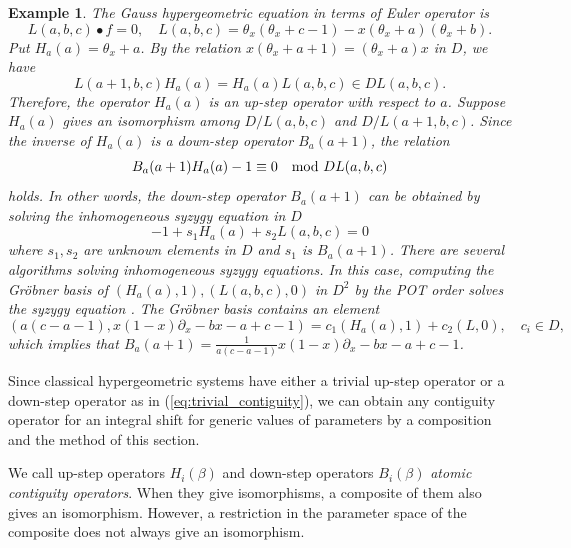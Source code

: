 \documentclass{article}
\def\aa{a}
\def\bb{b}
\def\cc{c}
\def\pd#1{\partial_{#1}}
\newtheorem{example}{Example}
\begin{document}
\begin{example}\rm \label{ex:gauss_contiguity}
The Gauss hypergeometric equation in terms of Euler operator is
\begin{equation}  \label{eq:gauss_by_Euler_op}
L(\aa,\bb,\cc) \bullet f=0, \quad
 L(\aa,\bb,\cc) = \theta_x(\theta_x+\cc-1) - x (\theta_x+\aa) (\theta_x+\bb).
\end{equation}
Put $H_\aa(\aa)=\theta_x+\aa$.
By the relation 
$x (\theta_x+\aa+1) = (\theta_x+\aa) x $ in $D$,
we have 
\begin{equation} \label{eq:trivial_contiguity}
 L(\aa+1,\bb,\cc) H_\aa(\aa) = H_\aa(\aa) L(\aa,\bb,\cc) \in D L(\aa,\bb,\cc).
\end{equation}
Therefore, the operator $H_\aa(\aa)$
is an up-step operator with respect to $\aa$.
Suppose $H_\aa(\aa)$ gives an isomorphism among $D/L(\aa,\bb,\cc)$
and $D/L(\aa+1,\bb,\cc)$.
Since the inverse of $H_\aa(\aa)$ is a down-step operator 
$B_\aa(\aa+1)$, 
the relation
\begin{equation} \label{eq:BH_relation}
B_\aa(\aa+1) H_\aa(\aa) - 1 \equiv 0 \quad {\rm mod}\  D L(\aa,\bb,\cc)
\end{equation}
holds.
In other words, the down-step operator $B_\aa(\aa+1)$ 
can be obtained by solving the inhomogeneous 
syzygy equation in $D$
\begin{equation} \label{eq:syzygy_gauss}
 -1 + s_1 H_\aa(\aa) + s_2 L(\aa,\bb,\cc)=0
\end{equation}
where $s_1, s_2$ are unknown elements in $D$
and $s_1$ is $B_\aa(\aa+1)$.
There are several algorithms solving inhomogeneous
syzygy equations.
In this case, computing the Gr\"obner basis
of $(H_\aa(\aa),1), (L(\aa,\bb,\cc),0)$ in $D^2$
by the POT order solves the syzygy equation \cite{nakayama-2024}.
The Gr\"obner basis contains an element
$$
(\aa(\cc-\aa-1), x(1-x) \pd{x}-\bb x-\aa+\cc-1)
= c_1 (H_\aa(\aa),1) + c_2 (L,0), \quad c_i \in D,
$$
which implies that
$
B_\aa(\aa+1)=\frac{1}{\aa(\cc-\aa-1)}
 x(1-x) \pd{x}-\bb x-\aa+\cc-1
$.
\end{example}

Since classical hypergeometric systems have 
either a trivial up-step operator or 
a down-step operator
as in (\ref{eq:trivial_contiguity}),
we can obtain any contiguity operator for an integral
shift for generic values of parameters
by a composition and the method of this section. 

We call
up-step operators $H_i(\beta)$ and 
down-step operators $B_i(\beta)$ 
{\it atomic contiguity operators}\/.
When they give isomorphisms, a composite of them
also gives an isomorphism.
However, a restriction in the parameter space 
of the composite 
does not always give an isomorphism.
\end{document}
